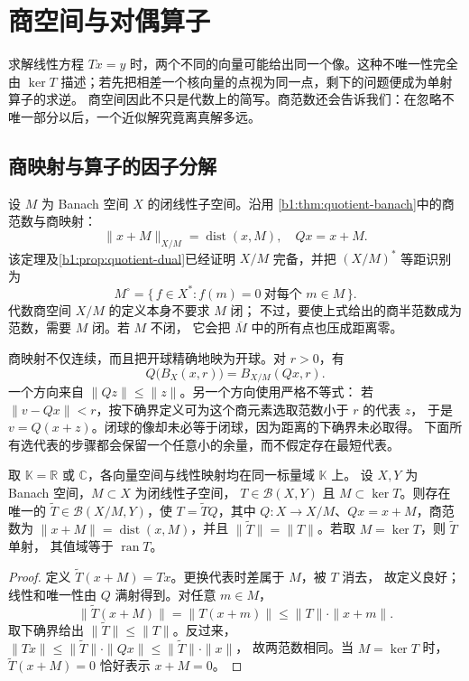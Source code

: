 \section{商空间与对偶算子}
\label{b1:sec:C101}

求解线性方程 \(Tx=y\) 时，两个不同的向量可能给出同一个像。这种不唯一性完全由
\(\ker T\) 描述；若先把相差一个核向量的点视为同一点，剩下的问题便成为单射算子的求逆。
商空间因此不只是代数上的简写。商范数还会告诉我们：在忽略不唯一部分以后，一个近似解究竟离真解多远。

\subsection{商映射与算子的因子分解}
\label{b1:subsec:C10101}

设 \(M\) 为 Banach 空间 \(X\) 的闭线性子空间。沿用%
\cref{b1:thm:quotient-banach}中的商范数与商映射：
\[
 \|x+M\|_{X/M}=\operatorname{dist}(x,M),\quad Qx=x+M.
\]
该定理及\cref{b1:prop:quotient-dual}已经证明 \(X/M\) 完备，并把 \((X/M)^*\) 等距识别为
\[
 M^\circ=\{\,f\in X^*:f(m)=0\ \text{对每个 }m\in M\,\}.
\]
代数商空间 \(X/M\) 的定义本身不要求 \(M\) 闭；
不过，要使上式给出的商半范数成为范数，需要 \(M\) 闭。若 \(M\) 不闭，
它会把 \(\overline M\) 中的所有点也压成距离零。

\ProseParagraphBreak

商映射不仅连续，而且把开球精确地映为开球。对 \(r>0\)，有
\[
 Q\bigl(B_X(x,r)\bigr)=B_{X/M}(Qx,r).
\]
一个方向来自 \(\|Qz\|\leq\|z\|\)。另一个方向使用严格不等式：
若 \(\|v-Qx\|<r\)，按下确界定义可为这个商元素选取范数小于 \(r\) 的代表 \(z\)，
于是 \(v=Q(x+z)\)。闭球的像却未必等于闭球，因为距离的下确界未必取得。
下面所有选代表的步骤都会保留一个任意小的余量，而不假定存在最短代表。

\begin{proposition}[商空间上的因子分解]\label{b1:prop:C1-quotient-factor}
取 \(\mathbb K=\mathbb R\) 或 \(\mathbb C\)，各向量空间与线性映射均在同一标量域 \(\mathbb K\) 上。
设 \(X,Y\) 为 Banach 空间，\(M\subset X\) 为闭线性子空间，
\(T\in\mathcal B(X,Y)\) 且 \(M\subset\ker T\)。则存在唯一的
\(\widetilde T\in\mathcal B(X/M,Y)\)，使 \(T=\widetilde TQ\)，其中 \(Q:X\to X/M\)、\(Qx=x+M\)，商范数为 \(\|x+M\|=\operatorname{dist}(x,M)\)，并且
\(\|\widetilde T\|=\|T\|\)。若取 \(M=\ker T\)，则 \(\widetilde T\) 单射，
其值域等于 \(\operatorname{ran}T\)。
\end{proposition}
\begin{proof}
定义 \(\widetilde T(x+M)=Tx\)。更换代表时差属于 \(M\)，被 \(T\) 消去，
故定义良好；线性和唯一性由 \(Q\) 满射得到。对任意 \(m\in M\)，
\[
 \|\widetilde T(x+M)\|=\|T(x+m)\|\leq\|T\|\cdot\|x+m\|.
\]
取下确界给出 \(\|\widetilde T\|\leq\|T\|\)。反过来，
\(\|Tx\|\leq\|\widetilde T\|\cdot\|Qx\|\leq\|\widetilde T\|\cdot\|x\|\)，
故两范数相同。当 \(M=\ker T\) 时，\(\widetilde T(x+M)=0\) 恰好表示 \(x+M=0\)。
\end{proof}

